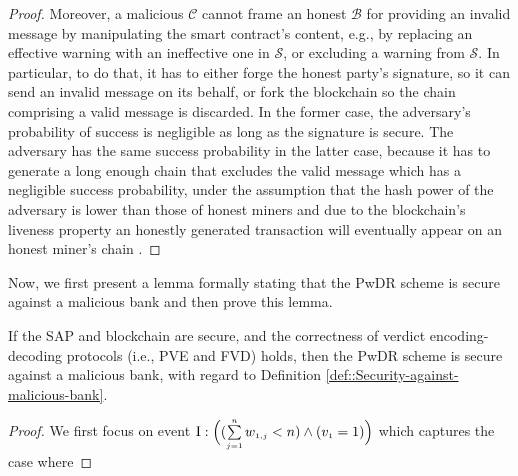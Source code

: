 \begin{proof}
 
 Moreover, a malicious $\mathcal{C}$ cannot frame an honest $\mathcal{B}$ for providing an invalid message by manipulating the smart contract’s content,  e.g., by replacing an effective warning with an ineffective one in $\mathcal{S}$, or excluding a warning from $\mathcal{S}$. In particular, to do that, it has to either  forge the honest party’s signature, so it can send an invalid message on its behalf, or fork the blockchain so the chain comprising a valid message is discarded. In the former case, the adversary’s probability of success is negligible as long as the signature is secure. The adversary has the same success probability in the latter case, because it has to generate a long enough chain that excludes the valid message which has a negligible success probability, under the assumption that the hash power of the adversary is lower than those of honest miners and due to the blockchain’s liveness property an honestly generated transaction will eventually appear on an honest miner’s chain \cite{GarayKL15}. 
\end{proof}


Now, we first present a lemma   formally stating that the PwDR scheme is secure against a malicious bank and then prove this lemma. 


\begin{lemma} If the  SAP and  blockchain are secure, and the correctness of verdict encoding-decoding protocols (i.e., PVE and FVD) holds, then the PwDR scheme is secure against a malicious bank, with regard to Definition \ref{def::Security-against-malicious-bank}. 
\end{lemma}



\begin{proof}

We first focus on event $\text{\MakeUppercase{\romannumeral 1}}:\Big( (\sum\limits_{\st j=1}^{\st n}w_{\st 1,j}< {n}) \wedge ( v_{\st 1}=1)\Big)$ which captures the case where 

\end{proof}




